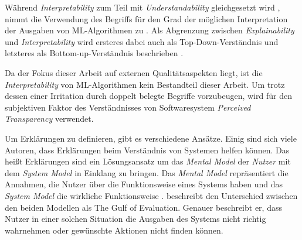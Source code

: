Während \textit{Interpretability} zum Teil mit \textit{Understandability} gleichgesetzt wird \cite{chazette_end-users_nodate}, nimmt die Verwendung des Begriffs für den Grad der möglichen Interpretation der Ausgaben von ML-Algorithmen zu \cite{doshi2017towards}. Als Abgrenzung zwischen \textit{Explainability} und \textit{Interpretability} wird ersteres dabei auch als \glqq Top-Down\grqq{}-Verständnis und letzteres als \glqq Bottom-up\grqq{}-Verständnis beschrieben \cite{thomson_knowledge--information_2020}.

Da der Fokus dieser Arbeit auf externen Qualitätsaspekten liegt, ist die \textit{Interpretability} von ML-Algorithmen kein Bestandteil dieser Arbeit. Um trotz dessen einer Irritation durch doppelt belegte Begriffe vorzubeugen, wird für den subjektiven Faktor des Verständnisses von Softwaresystem \textit{Perceived Transparency} verwendet.

\bigskip

Um Erklärungen zu definieren, gibt es verschiedene Ansätze. Einig sind sich viele Autoren, dass Erklärungen beim Verständnis von Systemen helfen können. Das heißt Erklärungen sind ein Lösungsansatz um das \textit{Mental Model} der \textit{Nutzer} mit dem \textit{System Model} in Einklang zu bringen. Das \textit{Mental Model} repräsentiert die Annahmen, die Nutzer über die Funktionsweise eines Systems haben und das \textit{System Model} die wirkliche Funktionsweise \cite{chi_three_nodate}. \citeauthor{norman1988psychology} beschreibt den Unterschied zwischen den beiden Modellen als \glqq The Gulf of Evaluation\grqq \cite{norman1988psychology}. Genauer beschreibt er, dass Nutzer in einer solchen Situation die Ausgaben des Systems nicht richtig wahrnehmen oder gewünschte Aktionen nicht finden können.

